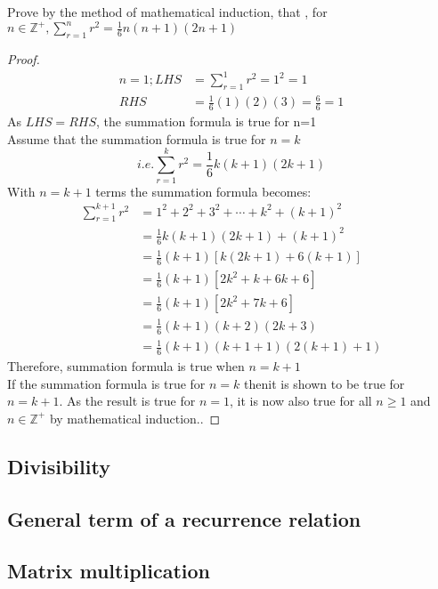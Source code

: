 \documentclass[a4paper]{article}
\begin{document}
\begin{eg}
Prove by the method of mathematical induction, that , for $n\in\mathbb{Z}^+ , \sum_{r=1}^nr^2=\frac{1}{6}n(n+1)(2n+1)$
\begin{proof}
\begin{align*}
n=1; LHS&=\sum_{r=1}^1r^2=1^2=1\\
RHS&=\frac{1}{6}(1)(2)(3)=\frac{6}{6}=1
\end{align*}
As $LHS=RHS$, the summation formula is true for n=1\\

Assume that the summation formula is true for $n=k$
\begin{equation*}
i.e.\sum_{r=1}^kr^2=\frac{1}{6}k(k+1)(2k+1)
\end{equation*}
With $n=k+1$ terms the summation formula becomes:
\begin{align*}
\sum_{r=1}^{k+1}r^2&=1^2+2^2+3^2+\cdots+k^2+(k+1)^2\\
&=\frac{1}{6}k(k+1)(2k+1)+(k+1)^2\\
&=\frac{1}{6}(k+1)[k(2k+1)+6(k+1)]\\
&=\frac{1}{6}(k+1)[2k^2+k+6k+6]\\
&=\frac{1}{6}(k+1)[2k^2+7k+6]\\
&=\frac{1}{6}(k+1)(k+2)(2k+3)\\
&=\frac{1}{6}(k+1)(k+1+1)(2(k+1)+1)
\end{align*}
Therefore, summation formula is true when $n=k+1$\\
If the summation formula is true for $n=k$ thenit is shown to be true for $n=k+1$. As the result is true for $n=1$, it is now also true for all $n\geq1$ and $n\in\mathbb{Z}^+$ by mathematical induction..
\end{proof}
\end{eg}

\subsection{Divisibility}

\subsection{General term of a recurrence relation}

\subsection{Matrix multiplication}
\end{document}
